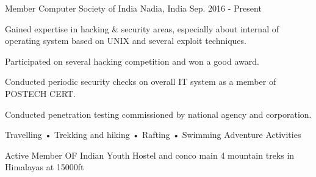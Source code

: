 \begin{cventries}
  \cventry
    {Member}
    {Computer Society of India}
    {Nadia, India}
    {Sep. 2016 - Present}
    {
      \begin{cvitems}
        \item {Gained expertise in hacking \& security areas, especially about internal of operating system based on UNIX and several exploit techniques.}
        \item {Participated on several hacking competition and won a good award.}
        \item {Conducted periodic security checks on overall IT system as a member of POSTECH CERT.}
        \item {Conducted penetration testing commissioned by national agency and corporation.}
      \end{cvitems}
    }
    \cventry
    {Travelling • Trekking and hiking • Rafting • Swimming}
    {Adventure Activities}
    {}
    {}
    {
      \begin{cvitems}
        \item {Active Member OF Indian Youth Hostel and conco main 4 mountain treks in Himalayas at 15000ft }
      \end{cvitems}
    }
\end{cventries}

